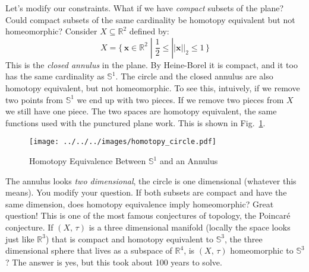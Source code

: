 \documentclass{article}
\theoremstyle{plain}
\theoremstyle{normal}
\begin{document}
        \par\hfill\par
        Let's modify our constraints. What if we have \textit{compact} subsets
        of the plane? Could compact subsets of the same cardinality be
        homotopy equivalent but not homeomorphic? Consider
        $X\subseteq\mathbb{R}^{2}$ defined by:
        \begin{equation}
            X=
            \big\{\,\mathbf{x}\in\mathbb{R}^{2}\;|\;
                \frac{1}{2}\leq||\mathbf{x}||_{2}\leq{1}\,\}
        \end{equation}
        This is the \textit{closed annulus} in the plane. By Heine-Borel it
        is compact, and it too has the same cardinality as $\mathbb{S}^{1}$.
        The circle and the closed annulus are also homotopy equivalent, but
        not homeomorphic. To see this, intuively, if we remove two points from
        $\mathbb{S}^{1}$ we end up with two pieces. If we remove two pieces
        from $X$ we still have one piece. The two spaces are homotopy
        equivalent, the same functions used with the punctured plane work.
        This is shown in Fig.~\ref{fig:homotopy_circle}.
        \begin{figure}[H]
            \centering
            \texttt{[image: ../../../images/homotopy\_circle.pdf]}
            \caption{Homotopy Equivalence Between $\mathbb{S}^{1}$ and an Annulus}
            \label{fig:homotopy_circle}
        \end{figure}
        \par\hfill\par
        The annulus looks \textit{two dimensional}, the circle is one
        dimensional (whatever this means). You modify your question.
        If both subsets are compact and have the same dimension, does homotopy
        equivalence imply homeomorphic? Great question! This is one of the
        most famous conjectures of topology, the Poincar\'{e} conjecture.
        If $(X,\,\tau)$ is a three dimensional manifold (locally the space
        looks just like $\mathbb{R}^{3}$) that is compact and homotopy
        equivalent to $\mathbb{S}^{3}$, the three dimensional sphere that lives
        as a subspace of $\mathbb{R}^{4}$, is $(X,\,\tau)$ homeomorphic to
        $\mathbb{S}^{3}$? The answer is yes, but this took about 100 years to
        solve.
\end{document}
